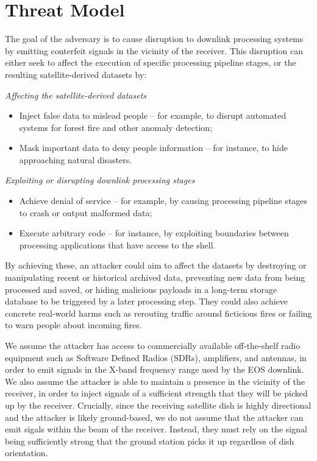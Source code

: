 \section{Threat Model}\label{sec:threat-model}

The goal of the adversary is to cause disruption to downlink processing systems by emitting conterfeit signals in the vicinity of the receiver.
This disruption can either seek to affect the execution of specific processing pipeline stages, or the resulting satellite-derived datasets by:


\noindent\textit{Affecting the satellite-derived datasets}
\begin{itemize}
    \item Inject false data to mislead people -- for example, to disrupt automated systems for forest fire and other anomaly detection;
    \item Mask important data to deny people information -- for instance, to hide approaching natural disasters.
\end{itemize}

\noindent\textit{Exploiting or disrupting downlink processing stages}
\begin{itemize}
    \item Achieve denial of service -- for example, by causing processing pipeline stages to crash or output malformed data;
    \item Execute arbitrary code -- for instance, by exploiting boundaries between processing applications that have access to the shell.
\end{itemize}

By achieving these, an attacker could aim to affect the datasets by destroying or manipulating recent or historical archived data, preventing new data from being processed and saved, or hiding malicious payloads in a long-term storage database to be triggered by a later processing step.
They could also achieve concrete real-world harms such as rerouting traffic around ficticious fires or failing to warn people about incoming fires.

We assume the attacker has access to commercially available off-the-shelf radio equipment such as Software Defined Radios (SDRs), amplifiers, and antennas, in order to emit signals in the X-band frequency range used by the EOS downlink.
We also assume the attacker is able to maintain a presence in the vicinity of the receiver, in order to inject signals of a sufficient strength that they will be picked up by the receiver.
Crucially, since the receiving satellite dish is highly directional and the attacker is likely ground-based, we do not assume that the attacker can emit sigals within the beam of the receiver.
Instead, they must rely on the signal being sufficiently strong that the ground station picks it up regardless of dish orientation. %

